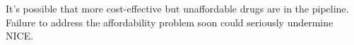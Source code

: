 It's possible that more cost-effective but unaffordable drugs are in the pipeline. Failure to address the affordability problem soon could seriously undermine NICE.